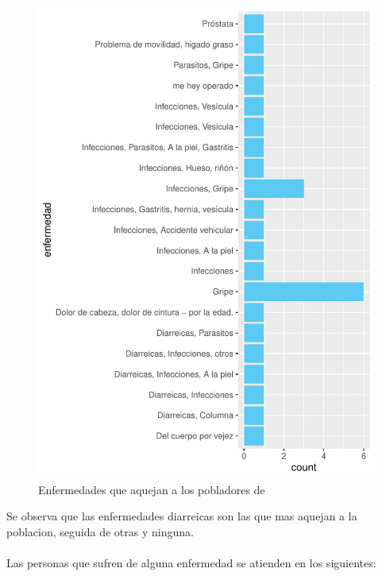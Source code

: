 \documentclass[12pt]{article}\usepackage[]{graphicx}\usepackage[]{xcolor}
\makeatletter
\def\maxwidth{ %
  \ifdim\Gin@nat@width>\linewidth
    \linewidth
  \else
    \Gin@nat@width
  \fi
}
\newenvironment{knitrout}{}{} %
\makeatother
\begin{document}
	\begin{figure}[H]
	\centering
\begin{knitrout}
\color{fgcolor}
\includegraphics[width=\maxwidth]{figure/nueve-1} 
\end{knitrout}
	\caption{Enfermedades que aquejan a los pobladores de \comunidad}
	\end{figure}
	Se observa que las enfermedades diarreicas son las que mas aquejan a la poblacion, seguida de otras y ninguna.\\
	\\
	Las personas que sufren de alguna enfermedad se atienden en los siguientes:
\end{document}
